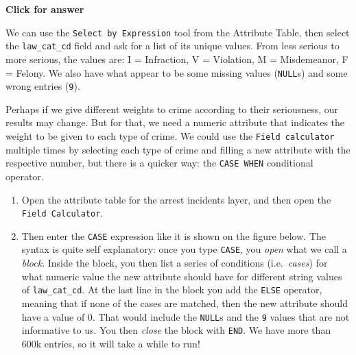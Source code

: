 \documentclass[
  letterpaper,
  DIV=11,
  numbers=noendperiod]{scrreprt}
\begin{document}
\begin{tcolorbox}[enhanced jigsaw, leftrule=.75mm, colframe=quarto-callout-important-color-frame, breakable, toprule=.15mm, bottomrule=.15mm, arc=.35mm, rightrule=.15mm, opacityback=0, colback=white, left=2mm]

\vspace{-3mm}\textbf{Click for answer}\vspace{3mm}

We can use the \texttt{Select\ by\ Expression} tool from the Attribute
Table, then select the \texttt{law\_cat\_cd} field and ask for a list of
its unique values. From less serious to more serious, the values are: I
= Infraction, V = Violation, M = Misdemeanor, F = Felony. We also have
what appear to be some missing values (\texttt{NULL}s) and some wrong
entries (\texttt{9}).

\end{tcolorbox}

Perhaps if we give different weights to crime according to their
seriousness, our results may change. But for that, we need a numeric
attribute that indicates the weight to be given to each type of crime.
We could use the \texttt{Field\ calculator} multiple times by selecting
each type of crime and filling a new attribute with the respective
number, but there is a quicker way: the \texttt{CASE\ WHEN} conditional
operator.

\begin{enumerate}
\def\labelenumi{(\arabic{enumi})}
\setcounter{enumi}{344}
\item
  Open the attribute table for the arrest incidents layer, and then open
  the \texttt{Field\ Calculator}.
\item
  Then enter the \texttt{CASE} expression like it is shown on the figure
  below. The syntax is quite self explanatory: once you type
  \texttt{CASE}, you \emph{open} what we call a \emph{block}. Inside the
  block, you then list a series of conditions (i.e.~\emph{cases}) for
  what numeric value the new attribute should have for different string
  values of \texttt{law\_cat\_cd}. At the last line in the block you add
  the \texttt{ELSE} operator, meaning that if none of the cases are
  matched, then the new attribute should have a value of 0. That would
  include the \texttt{NULL}s and the \texttt{9} values that are not
  informative to us. You then \emph{close} the block with \texttt{END}.
  We have more than 600k entries, so it will take a while to run!
\end{enumerate}
\end{document}
